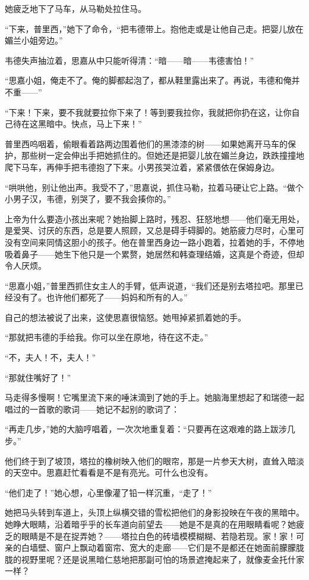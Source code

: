 \par 她疲乏地下了马车，从马勒处拉住马。
\par “下来，普里西，”她下了命令，“把韦德带上。抱他走或是让他自己走。把婴儿放在媚兰小姐旁边。”
\par 韦德失声抽泣着，思嘉从中只能听得清：“暗——暗——韦德害怕！”
\par “思嘉小姐，俺走不了。俺的脚都起泡了，都从鞋里露出来了。再说，韦德和俺并不重——”
\par “下来！下来，要不我就要拉你下来了！等到要我拉你，我就把你扔在这，让你自己待在这黑暗中。快点，马上下来！”
\par 普里西呜咽着，偷眼看着路两边围着他们的黑漆漆的树——如果她离开马车的保护，那些树一定会伸出手把她抓住的。但她还是把婴儿放在媚兰身边，跌跌撞撞地爬下马车，再伸手把韦德抱了下来。小男孩哭泣着，紧紧偎依在保姆身边。
\par “哄哄他，别让他出声。我受不了，”思嘉说，抓住马勒，拉着马硬让它上路。“做个小男子汉，韦德，别哭了，要不我会揍你的。”
\par 上帝为什么要造小孩出来呢？她抬脚上路时，残忍、狂怒地想——他们毫无用处，是爱哭、讨厌的东西，总是要人照顾，又总是碍手碍脚的。她筋疲力尽时，心里可没有空间来同情这胆小的孩子。他在普里西身边一路小跑着，拉着她的手，不停地吸着鼻子——她生下他只是一个累赘，她居然和韩查理结婚，这真是个奇迹，但却令人厌烦。
\par “思嘉小姐，”普里西抓住女主人的手臂，低声说道，“我们还是别去塔拉吧。那里已经没有了。也许他们都死了——妈妈和所有的人。”
\par 自己的想法被说了出来，这使思嘉很恼怒。她甩掉紧抓着她的手。
\par “那就把韦德的手给我。你可以坐在原地，待在这不走。”
\par “不，夫人！不，夫人！”
\par “那就住嘴好了！”
\par 马走得多慢啊！它嘴里流下来的唾沫滴到了她的手上。她脑海里想起了和瑞德一起唱过的一首歌的歌词——她记不起别的歌词了：
\par “再走几步，”她的大脑哼唱着，一次次地重复着：“只要再在这艰难的路上跋涉几步。”
\par 他们终于到了坡顶，塔拉的橡树映入他们的眼帘，那是一片参天大树，直耸入暗淡的天空中。思嘉赶忙看看是不是有亮光。可什么也没有。
\par “他们走了！”她心想，心里像灌了铅一样沉重，“走了！”
\par 她把马头转到车道上，头顶上纵横交错的雪松把他们的身影投映在午夜的黑暗中。她睁大眼睛，沿着暗乎乎的长车道向前望去——她是不是真的在用眼睛看呢？她疲乏的眼睛是不是在捉弄她？——塔拉白色的砖墙模模糊糊、若隐若现。家！家！可亲的白墙壁、窗户上飘动着窗帘、宽大的走廊——它们是不是都还在她面前朦朦胧胧的视野里呢？还是说黑暗仁慈地把那副可怕的场景遮掩起来了，就像麦金托什家一样？
